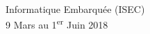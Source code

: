 \begin{titlepage}

{\large Informatique Embarquée (ISEC)}\\[10pt]


{\large 9 Mars au 1\textsuperscript{er} Juin 2018}\\[2cm] %


 

\vfill %

\end{titlepage}

\shipout\null

%
%
%
%
%    
%
%
